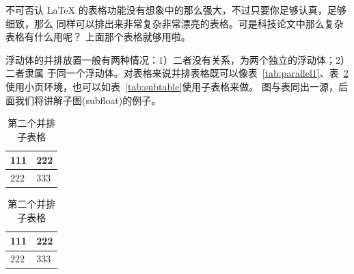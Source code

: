 不可否认 \LaTeX{} 的表格功能没有想象中的那么强大，不过只要你足够认真，足够细致，那么
同样可以排出来非常复杂非常漂亮的表格。可是科技论文中那么复杂表格有什么用呢？
上面那个表格就够用啦。

浮动体的并排放置一般有两种情况：1）二者没有关系，为两个独立的浮动体；2）二者隶属
于同一个浮动体。对表格来说并排表格既可以像表~\ref{tab:parallel1}、表~\ref{tab:parallel2}
使用小页环境，也可以如表~\ref{tab:subtable}使用子表格来做。
图与表同出一源，后面我们将讲解子图(subfloat)的例子。
\begin{table}[htb]
\centering
\noindent\begin{minipage}{0.45\textwidth}
\centering
\caption{第一个并排子表格}
\label{tab:parallel1}
\begin{tabular}{p{2cm}p{2cm}}
\toprule[1.5pt]
111 & 222 \\\midrule[1pt]
222 & 333 \\\bottomrule[1.5pt]
\end{tabular}
\end{minipage}
\begin{minipage}{0.45\textwidth}
\centering
\caption{第二个并排子表格}
\label{tab:parallel2}
\begin{tabular}{p{2cm}p{2cm}}
\toprule[1.5pt]
111 & 222 \\\midrule[1pt]
222 & 333 \\\bottomrule[1.5pt]
\end{tabular}
\end{minipage}
\end{table}
\begin{table}[htbp]
\centering
\caption{并排子表格}
\label{tab:subtable}
\hskip2cm
\end{table}

